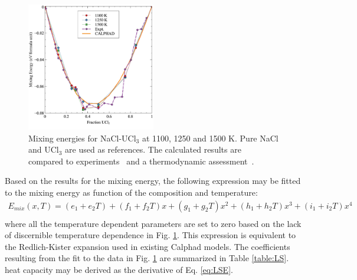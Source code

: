 \documentclass[preprint,3p,10pt,onecolumn,number,sort&compress]{elsarticle}
\begin{document}
\begin{figure}[htb]
\centering
\includegraphics[width=0.5\textwidth]{fig10.jpg}
\caption{Mixing energies for NaCl-UCl$_3$ at 1100, 1250 and 1500 K. Pure NaCl and UCl$_3$ are used as references. The calculated results are compared to experiments~\cite{Matsuura} and a thermodynamic assessment~\cite{YIN2020}.%
} 
\label{fig:mixing}
\end{figure}

Based on the results for the mixing energy, the following expression may be fitted to the mixing energy as function of the composition and temperature:
\begin{equation}
\begin{split}
E_{mix}(x,T)=(e_1+e_2T)+(f_1+f_2T)x+(g_1+g_2T)x^2+(h_1+h_2T)x^3+(i_1+i_2T)x^4\\
\label{eq:LSE}
\end{split}
\end{equation}
where all the temperature dependent parameters are set to zero based on the lack of discernible temperature dependence in Fig. \ref{fig:mixing}. This expression is equivalent to the Redlich-Kister expansion used in existing Calphad models. The coefficients resulting from the fit to the data in Fig. \ref{fig:mixing} are summarized in Table \ref{table:LS}. heat capacity may be derived as the derivative of Eq. \ref{eq:LSE}.

\FloatBarrier
\end{document}
